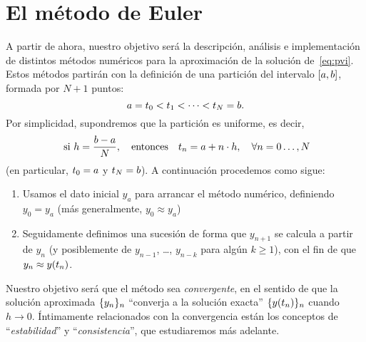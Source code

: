 \section{El método de Euler}

A partir de ahora, nuestro objetivo será la descripción, análisis e
implementación de distintos métodos numéricos para la aproximación de
la solución de~\eqref{eq:pvi}. Estos métodos partirán con la
definición de una partición del intervalo $[\ta,\tb]$, formada por
$N+1$ puntos:
\begin{equation*}
  \ta=\tt_0 < \tt_1 < \cdots < \tt_N=\tb.
\end{equation*}
Por simplicidad, supondremos que la partición es uniforme, es decir,
\begin{equation*}
  \text{ si } h=\frac{b-a}{N}, \quad \text{entonces} \quad
  \tt_n=\ta+n\cdot h,\quad \forall n=0\dots,N
\end{equation*}
(en particular, $\tt_0=a$ y $\tt_N=b$). A continuación procedemos como
sigue:
\begin{enumerate}
\item Usamos el dato inicial $y_a$ para arrancar el método numérico,
  definiendo $y_0=y_a$ (más generalmente, $y_0\approx y_a$)
\item Seguidamente definimos una sucesión de forma que $y_{n+1}$ se
  calcula a partir de $y_n$ (y posiblemente de $y_{n-1}$, \dots,
  $y_{n-k}$ para algún $k\ge 1$), con el fin de que
  $y_n\approx\sol(\tn)$.
\end{enumerate}
Nuestro objetivo será que el método sea \textit{convergente}, en el
sentido de que la solución aproximada $\{\yn\}_n$ ``converja a la
solución exacta'' $\{\sol(\tn)\}_n$ cuando $h\to 0$. Íntimamente
relacionados con la convergencia están los conceptos de
``\textit{estabilidad}'' y ``\textit{consistencia}'', que estudiaremos
más adelante.

